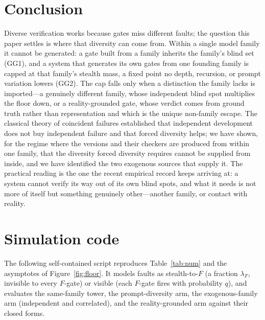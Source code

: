 \documentclass[11pt]{article}
\theoremstyle{definition}
\theoremstyle{remark}
\newcommand{\lF}{\lambda_{F}}
\begin{document}
\section{Conclusion}
Diverse verification works because gates miss different faults; the question this paper settles is
where that diversity can come from. Within a single model family it cannot be generated: a gate built
from a family inherits the family's blind set (GG1), and a system that generates its own gates from
one founding family is capped at that family's stealth mass, a fixed point no depth, recursion, or
prompt variation lowers (GG2). The cap falls only when a distinction the family lacks is imported---a
genuinely different family, whose independent blind spot multiplies the floor down, or a
reality-grounded gate, whose verdict comes from ground truth rather than representation and which is
the unique non-family escape. The classical theory of coincident failures established that
independent development does not buy independent failure and that forced diversity helps; we have
shown, for the regime where the versions and their checkers are produced from within one family, that
the diversity forced diversity requires cannot be supplied from inside, and we have identified the two
exogenous sources that supply it. The practical reading is the one the recent empirical record keeps
arriving at: a system cannot verify its way out of its own blind spots, and what it needs is not more
of itself but something genuinely other---another family, or contact with reality.

\appendix
\section{Simulation code}\label{app:code}
The following self-contained script reproduces Table~\ref{tab:num} and the asymptotes of
Figure~\ref{fig:floor}. It models faults as stealth-to-$F$ (a fraction $\lF$, invisible to every
$F$-gate) or visible (each $F$-gate fires with probability $q$), and evaluates the same-family tower,
the prompt-diversity arm, the exogenous-family arm (independent and correlated), and the
reality-grounded arm against their closed forms.
\end{document}
